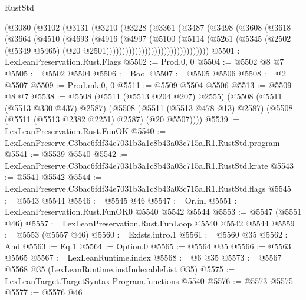 \begin{lexlean}{RustStd}
\begin{coremodule}
                          (@3080
                            (@3102
                              (@3131
                                (@3210
                                  (@3228
                                    (@3361
                                      (@3487
                                        (@3498
                                          (@3608
                                            (@3618
                                              (@3664
                                                (@4510
                                                  (@4693
                                                    (@4916
                                                      (@4997
                                                        (@5100
                                                          (@5114
                                                            (@5261
                                                              (@5345
                                                                (@2502
                                                                  (@5349 @5465)
                                                                  (@20
                                                                    @2501))))))))))))))))))))))))))))))))
@5501 := LexLeanPreservation.Rust.Flags
@5502 := Prod.{0, 0}
@5504 := @5502 @8 @7
@5505 := @5502 @5504
@5506 := Bool
@5507 := @5505 @5506
@5508 := @2 @5507
@5509 := Prod.mk.{0, 0}
@5511 := @5509 @5504 @5506
@5513 := @5509 @8 @7
@5538 := @5508
    (@5511 (@5513 @204 @207) @2555)
    (@5508
      (@5511 (@5513 @330 @437) @2587)
      (@5508 (@5511 (@5513 @478 @13) @2587) (@5508 (@5511 (@5513 @2382 @2251) @2587) (@20 @5507))))
@5539 := LexLeanPreservation.Rust.FunOK
@5540 := LexLeanPreserve.C3bac6fdf34e7031b3a1c8b43a03c715a.R1.RustStd.program
@5541 := @5539 @5540
@5542 := LexLeanPreserve.C3bac6fdf34e7031b3a1c8b43a03c715a.R1.RustStd.krate
@5543 := @5541 @5542
@5544 := LexLeanPreserve.C3bac6fdf34e7031b3a1c8b43a03c715a.R1.RustStd.flags
@5545 := @5543 @5544
@5546 := @5545 @46
@5547 := Or.inl
@5551 := LexLeanPreservation.Rust.FunOK0 @5540 @5542 @5544
@5553 := @5547 (@5551 @46)
@5557 := LexLeanPreservation.Rust.FunLoop @5540 @5542 @5544
@5559 := @5553 (@5557 @46)
@5560 := Exists.intro.{1}
@5561 := @5560 @35
@5562 := And
@5563 := Eq.{1}
@5564 := Option.{0}
@5565 := @5564 @35
@5566 := @5563 @5565
@5567 := LexLeanRuntime.index
@5568 := @6 @35
@5573 := @5567 @5568 @35 (LexLeanRuntime.instIndexableList @35)
@5575 := LexLeanTarget.TargetSyntax.Program.functions @5540
@5576 := @5573 @5575
@5577 := @5576 @46

\end{coremodule}
\end{lexlean}
